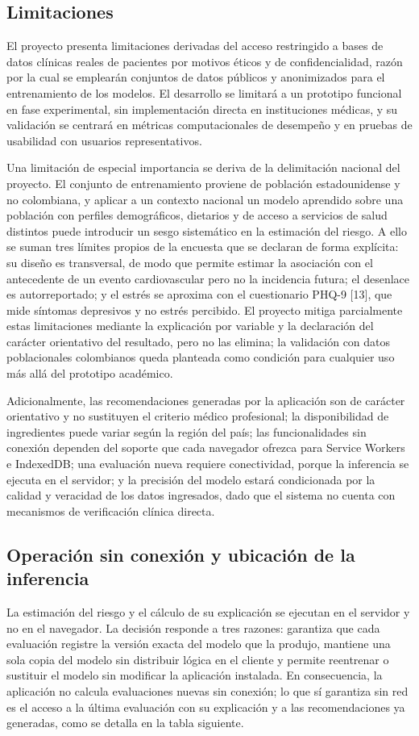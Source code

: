 \documentclass[conference]{IEEEtran}
\begin{document}
\subsection{Limitaciones}
El proyecto presenta limitaciones derivadas del acceso restringido a bases de datos clínicas reales de pacientes por motivos éticos y de confidencialidad, razón por la cual se emplearán conjuntos de datos públicos y anonimizados para el entrenamiento de los modelos. El desarrollo se limitará a un prototipo funcional en fase experimental, sin implementación directa en instituciones médicas, y su validación se centrará en métricas computacionales de desempeño y en pruebas de usabilidad con usuarios representativos.

Una limitación de especial importancia se deriva de la delimitación nacional del proyecto. El conjunto de entrenamiento proviene de población estadounidense y no colombiana, y aplicar a un contexto nacional un modelo aprendido sobre una población con perfiles demográficos, dietarios y de acceso a servicios de salud distintos puede introducir un sesgo sistemático en la estimación del riesgo. A ello se suman tres límites propios de la encuesta que se declaran de forma explícita: su diseño es transversal, de modo que permite estimar la asociación con el antecedente de un evento cardiovascular pero no la incidencia futura; el desenlace es autorreportado; y el estrés se aproxima con el cuestionario PHQ-9 [13], que mide síntomas depresivos y no estrés percibido. El proyecto mitiga parcialmente estas limitaciones mediante la explicación por variable y la declaración del carácter orientativo del resultado, pero no las elimina; la validación con datos poblacionales colombianos queda planteada como condición para cualquier uso más allá del prototipo académico.

Adicionalmente, las recomendaciones generadas por la aplicación son de carácter orientativo y no sustituyen el criterio médico profesional; la disponibilidad de ingredientes puede variar según la región del país; las funcionalidades sin conexión dependen del soporte que cada navegador ofrezca para Service Workers e IndexedDB; una evaluación nueva requiere conectividad, porque la inferencia se ejecuta en el servidor; y la precisión del modelo estará condicionada por la calidad y veracidad de los datos ingresados, dado que el sistema no cuenta con mecanismos de verificación clínica directa.

\subsection{Operación sin conexión y ubicación de la inferencia}
La estimación del riesgo y el cálculo de su explicación se ejecutan en el servidor y no en el navegador. La decisión responde a tres razones: garantiza que cada evaluación registre la versión exacta del modelo que la produjo, mantiene una sola copia del modelo sin distribuir lógica en el cliente y permite reentrenar o sustituir el modelo sin modificar la aplicación instalada. En consecuencia, la aplicación no calcula evaluaciones nuevas sin conexión; lo que sí garantiza sin red es el acceso a la última evaluación con su explicación y a las recomendaciones ya generadas, como se detalla en la tabla siguiente.
\end{document}
